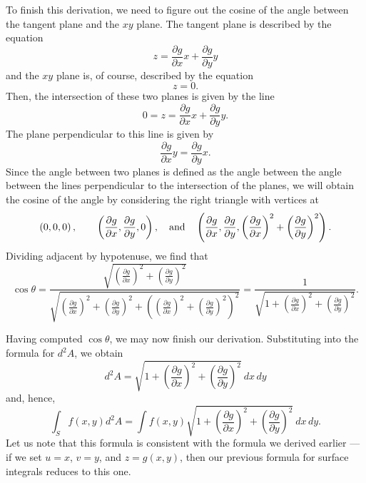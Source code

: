 \documentclass[12pt]{article}
\begin{document}
To finish this derivation, we need to figure out the cosine of the angle between the tangent plane and the $xy$ plane.  The tangent plane is described by the equation
 $$z = \frac{\partial g}{\partial x} x + \frac{\partial g}{\partial y} y$$
and the $xy$ plane is, of course, described by the equation
 $$z = 0.$$
Then, the intersection of these two planes is given by the line
 $$0 = z = \frac{\partial g}{\partial x} x + \frac{\partial g}{\partial y} y.$$
The plane perpendicular to this line is given by
 $$\frac{\partial g}{\partial x} y = \frac{\partial g}{\partial y} x.$$
Since the angle between two planes is defined as the angle between the angle between the lines perpendicular to the intersection of the planes, we will obtain the cosine of the angle by considering the right triangle with vertices at
 $$\left( 0, 0, 0 \right), \qquad \left( \frac{\partial g}{\partial x}, \frac{\partial g}{\partial y}, 0 \right), \quad\hbox{and}\quad \left( \frac{\partial g}{\partial x}, \frac{\partial g}{\partial y}, \left( \frac{\partial g}{\partial x} \right)^2 + \left( \frac{\partial g}{\partial y} \right)^2 \right).$$
Dividing adjacent by hypotenuse, we find that
 $$\cos \theta = \frac{\sqrt{\left( \frac{\partial g}{\partial x} \right)^2 + \left( \frac{\partial g}{\partial y} \right)^2}}{\sqrt{\left( \frac{\partial g}{\partial x} \right)^2 + \left( \frac{\partial g}{\partial y} \right)^2 + \left( \left( \frac{\partial g}{\partial x} \right)^2 + \left( \frac{\partial g}{\partial y} \right)^2 \right)^2}} = \frac{1}{\sqrt{1 + \left( \frac{\partial g}{\partial x} \right)^2 + \left( \frac{\partial g}{\partial y} \right)^2}}.$$

Having computed $\cos \theta$, we may now finish our derivation.  Substituting into the formula for $d^2 A$, we obtain
 $$d^2 A = \sqrt{1 + \left( \frac{\partial g}{\partial x} \right)^2 + \left( \frac{\partial g}{\partial y} \right)^2} \> dx \, dy$$
and, hence,
 $$\int_S f(x,y) d^2 A = \int f(x,y)\sqrt{1 + \left( \frac{\partial g}{\partial x} \right)^2 + \left( \frac{\partial g}{\partial y} \right)^2} \> dx \, dy.$$
Let us note that this formula is consistent with the formula we derived earlier --- if we set $u = x$, $v = y$, and $z = g(x,y)$, then our previous formula for surface integrals reduces to this one.
\end{document}
